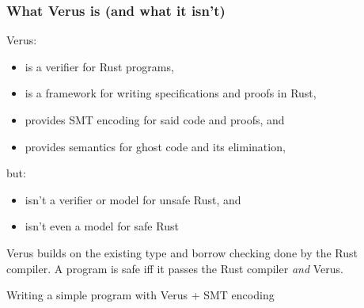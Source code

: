 \documentclass[
  aspectratio=1610, 
  xcolor={dvipsnames},
]{beamer}
\begin{document}

\begin{frame}[fragile]
  \frametitle{What Verus is (and what it isn't)}

  Verus:

  \begin{itemize}[<+->]
    \item[\cmark] is a verifier for Rust programs,
    \item[\cmark] is a framework for writing specifications and proofs in Rust,
    \item[\cmark] provides SMT encoding for said code and proofs, and
    \item[\cmark] provides semantics for ghost code and its elimination,
  \end{itemize}

  \pause
  but:

  \begin{itemize}[<+->]
    \item[\xmark] isn't a verifier or model for unsafe Rust, and
    \item[\xmark] isn't even a model for safe Rust
  \end{itemize}

  \pause
  Verus builds on the existing type and borrow checking done by the Rust
  compiler. \pause A program is safe iff it passes the Rust compiler \emph{and}
  Verus.

\end{frame}


\begin{frame}

  \begin{center}
    \large
    Writing a simple program with Verus + SMT encoding
  \end{center}

\end{frame}

\end{document}
